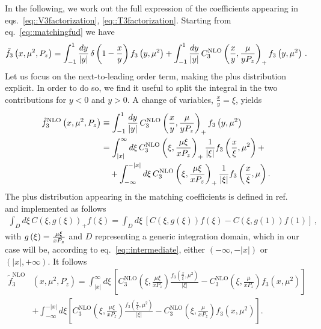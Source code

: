 In the following, we work out the full expression of the coefficients appearing in eqs.~\eqref{eq::V3factorization}, \eqref{eq::T3factorization}.
Starting from eq.~\eqref{eq::matchingfud} we have
\begin{align}
	\label{eq::explicitmatching}
	\tilde{f}_3\left(x,\mu^2,P_z\right) = \int_{-1}^{1} \frac{dy}{|y|}\, \delta\left( 1- \frac{x}{y} \right)  
	f_{3}\left( y, {\mu}^2\right) + \int_{-1}^{1} \frac{dy}{|y|}\, C_{3}^{\text{NLO}}\left(\frac{x}{y},\frac{\mu}{y P_z}\right)_+  
	f_{3}\left( y, {\mu}^2\right)\, .
\end{align}
Let us focus on the next-to-leading order term, making the plus distribution
explicit. In order to do so, we find it useful to split the integral in the two
contributions for $y<0$ and $y>0$. A change of variables, $\frac{x}{y} =
\xi$, yields 
\begin{align}
\label{eq::intermediate}
	\tilde{f}_3^{\text{NLO}}\left(x,\mu^2,P_z\right) 
	  & \equiv \int_{-1}^{1} \frac{dy}{|y|}\, 
	C_{3}^{\text{NLO}}\left(\frac{x}{y},\frac{\mu}{y P_z}\right)_+ 
	f_{3}\left( y, \mu^2\right) \nonumber \\ 
	  & = \int_{|x|}^{\infty} d\xi\,          
	C_3^{\text{NLO}}\left(\xi,\frac{\mu\xi}{x P_z}\right)_+ 
	\frac{1}{|\xi|} f_3\left(\frac{x}{\xi},\mu^2\right) + \nonumber \\
	  & \quad + \int_{-\infty}^{-|x|} d\xi\,  
	C_3^{\text{NLO}}\left(\xi,\frac{\mu\xi}{xP_z}\right)_+ 
	\frac{1}{|\xi|} f_3\left(\frac{x}{\xi},\mu\right). 
\end{align}
%
The plus distribution appearing in the matching coefficients is defined in ref.~\cite{Izubuchi:2018srq} and implemented as
follows
\begin{align}
	\int_D d\xi\, 
	C\left(\xi,g\left(\xi\right)\right)_+ f\left(\xi\right) 
	= \int_D d\xi\,
	\left[C\left(\xi,g\left(\xi\right)\right)f\left(\xi\right) - 
	C\left(\xi,g\left(1\right)\right)f\left(1\right) \right]\, , 
\end{align}
with $g\left(\xi\right) =\frac{\mu\xi}{xP_z} $ and $D$ representing a generic integration domain, which in our case will be, according to eq.~\eqref{eq::intermediate},
either $\left(-\infty,-|x|\right)$ or $\left(|x|,+\infty\right)$. 
It follows
\begin{align}
	\tilde{f}_3^{\text{NLO}}&\left(x,\mu^2,P_z\right) 
	   =\int_{|x|}^{\infty} d\xi\, 
	  \left[ C_3^{\text{NLO}}\left(\xi,\frac{\mu\xi}{xP_z}\right)
	  \frac{f_3\left(\frac{x}{\xi},\mu^2\right)}{|\xi|} - 
	  C_3^{\text{NLO}}\left(\xi,\frac{\mu}{xP_z}\right) f_3\left(x,\mu^2\right)\right] \nonumber \\
	  &  
	  + \int_{-\infty}^{-|x|}d\xi
	  \left[C_3^{\text{NLO}}\left(\xi,\frac{\mu\xi}{xP_z}\right)
	  \frac{f_3\left(\frac{x}{\xi},\mu^2\right)}{|\xi|} - 
	  C_3^{\text{NLO}}\left(\xi,\frac{\mu}{xP_z}\right)f_3\left(x,\mu^2\right)\right]. 
\end{align}
